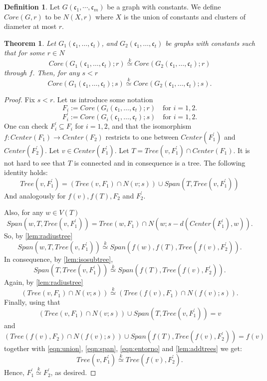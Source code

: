\documentclass[11pt,notitlepage]{report}
\newtheorem{theorem}{Theorem}[chapter]
\theoremstyle{definition}
\newtheorem{definition}{Definition}[chapter]
\newcommand{\cc}{\mathfrak{c}}
\newcommand{\clist}{\mathfrak{c}_{1}, \cdots, \mathfrak{c}_m}
\newcommand{\morph}[1]{\stackrel{#1}{\simeq}}
\begin{document}
\begin{definition} 
	Let $G(\clist)$ be a graph with constants. We define $Core(G,r)$ to be
	$N(X,r)$ where $X$ is the union of constants and clusters of diameter at most $r$. 
\end{definition}

\begin{theorem} \label{thm:lessradius}
	Let $G_1(\cc_1,\dots, \cc_t)$, and $G_2(\cc_1,\dots,\cc_t)$ be graphs
	with constants such that for some $r\in N$
	\[ Core(G_1(\cc_1,\dots, \cc_t);r)\morph{k} Core(G_2(\cc_1,\dots, \cc_t);r)\]
	through $f$. 
	Then, for any $s<r$
	\[ Core(G_1(\cc_1,\dots, \cc_t);s)\morph{k} Core(G_2(\cc_1,\dots, \cc_t);s).\]
\end{theorem}
\begin{proof}
	Fix $s<r$. Let us introduce some notation
	\[ F_i:= Core(G_i(\cc_1,\dots, \cc_t);r) \quad \text{for }i=1,2.\]
	\[ F^\prime_i:= Core(G_i(\cc_1,\dots, \cc_t);s) \quad \text{for }i=1,2.\]
	One can check $F^\prime_i\subseteq F_i$ for $i=1,2$, and that the isomorphism 
	$f:Center(F_1)\rightarrow Center(F_2)$ restricts to one between
	$Center(F^\prime_1)$ and $Center(F^\prime_2)$. Let $v\in Center(F^\prime_1)$.
	Let $T=Tree(v,F^\prime_1)\cap Center(F_1)$. It is not hard to see that $T$ is connected 
	and in consequence is a tree. The following identity holds:
	\begin{equation} \label{eqn:union}
	Tree(v,F^\prime_1)= (Tree(v,F_1)\cap N(v;s))
	\cup Span(T, Tree(v,F^\prime_1)) 
	\end{equation}
	And analogously for $f(v), f(T), F_2$ and $F^\prime_2$.\par
	Also, for any $w\in V(T)$
	\[Span(w,T, Tree(v,F^\prime_1)) =
	Tree(w,F_1)\cap N(w; s-d(Center(F^\prime_1),w)).\]
	So, by \cref{lem:radiustree}
	\[Span(w,T,Tree(v,F^\prime_1))\morph{k}
	Span(f(w),f(T),Tree(f(v),F^\prime_2)).\]
	In consequence, by \cref{lem:isosubtree},
	\begin{equation} \label{eqn:span}
	Span(T,Tree(v,F^\prime_1))\morph{k} Span(f(T),Tree(f(v),F^\prime_2)).
	\end{equation}
	Again, by \cref{lem:radiustree} 
	\begin{equation} \label{eqn:entorno}
	(Tree(v,F_1)\cap N(v;s))\morph{k}(Tree(f(v),F_1)\cap N(f(v);s)).
	\end{equation}
	Finally, using that
	\[(Tree(v,F_1)\cap N(v;s))\cup Span(T,Tree(v,F^\prime_1))=v\]
	and
	\[(Tree(f(v),F_2)\cap N(f(v);s))\cup Span(f(T),Tree(f(v),F^\prime_2))=f(v)\]
	together with \cref{eqn:union},
	\cref{eqn:span}, \cref{eqn:entorno} and \cref{lem:addtrees} we get:
	\[Tree(v,F^\prime_1)\morph{k} Tree(f(v),F^\prime_2) .\]
	Hence, $F^\prime_1\morph{k} F^\prime_2$, as desired. 
\end{proof}
\end{document}
